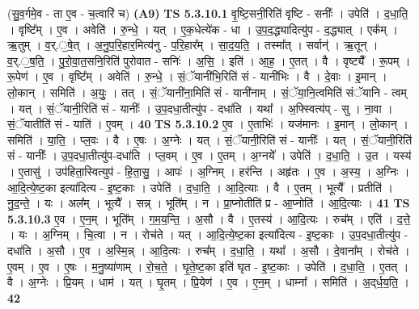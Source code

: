 \documentclass[17pt]{extarticle}
\begin{document}
                  \newline
                      (सु॒व॒र्गमे॒व - ता ए॒व - च॒त्वारि॑ च)  \textbf{(A9)} \newline \newline
                                \textbf{ TS 5.3.10.1} \newline
                  वृ॒ष्टि॒सनी॒रिति॑ वृष्टि - सनीः᳚ । उपेति॑ । द॒धा॒ति॒ । वृष्टि᳚म् । ए॒व । अवेति॑ । रु॒न्धे॒ । यत् । ए॒क॒धेत्ये॑क - धा । उ॒प॒द॒द्ध्यादित्यु॑प - द॒द्ध्यात् । एक᳚म् । ऋ॒तुम् । व॒र्.॒षे॒त् । अ॒नु॒प॒रि॒हार॒मित्य॑नु - प॒रि॒हार᳚म् । सा॒द॒य॒ति॒ । तस्मा᳚त् । सर्वान्॑ । ऋ॒तून् । व॒र्.॒ष॒ति॒ । पु॒रो॒वा॒त॒सनि॒रिति॑ पुरोवात - सनिः॑ । अ॒सि॒ । इति॑ । आ॒ह॒ । ए॒तत् । वै । वृष्ट्यै᳚ । रू॒पम् । रू॒पेण॑ । ए॒व । वृष्टि᳚म् । अवेति॑ । रु॒न्धे॒ । सं॒ॅयानी॑भि॒रिति॑ सं - यानी॑भिः । वै । दे॒वाः । इ॒मान् । लो॒कान् । समिति॑ । अ॒युः॒ । तत् । सं॒ॅयानी॑ना॒मिति॑ सं - यानी॑नाम् । सं॒ॅया॒नि॒त्वमिति॑ संॅयानि - त्वम् । यत् । सं॒ॅयानी॒रिति॑ सं - यानीः᳚ । उ॒प॒दधा॒तीत्यु॑प - दधा॑ति । यथा᳚ । अ॒फ्स्वित्य॑प् - सु । ना॒वा । सं॒ॅयातीति॑ सं - याति॑ । ए॒वम् । \textbf{  40} \newline
                  \newline
                                \textbf{ TS 5.3.10.2} \newline
                  ए॒व । ए॒ताभिः॑ । यज॑मानः । इ॒मान् । लो॒कान् । समिति॑ । या॒ति॒ । प्ल॒वः । वै । ए॒षः । अ॒ग्नेः । यत् । सं॒ॅयानी॒रिति॑ सं - यानीः᳚ । यत् । सं॒ॅयानी॒रिति॑ सं - यानीः᳚ । उ॒प॒दधा॒तीत्यु॑प-दधा॑ति । प्ल॒वम् । ए॒व । ए॒तम् । अ॒ग्नये᳚ । उपेति॑ । द॒धा॒ति॒ । उ॒त । यस्य॑ । ए॒तासु॑ । उप॑हिता॒स्वित्युप॑ - हि॒ता॒सु॒ । आपः॑ । अ॒ग्निम् । हर॑न्ति । अहृ॑तः । ए॒व । अ॒स्य॒ । अ॒ग्निः । आ॒दि॒त्ये॒ष्ट॒का इत्या॑दित्य - इ॒ष्ट॒काः । उपेति॑ । द॒धा॒ति॒ । आ॒दि॒त्याः । वै । ए॒तम् । भूत्यै᳚ । प्रतीति॑ । नु॒द॒न्ते॒ । यः । अल᳚म् । भूत्यै᳚ । सन्न् । भूति᳚म् । न । प्रा॒प्नोतीति॑ प्र - आ॒प्नोति॑ । आ॒दि॒त्याः । \textbf{  41} \newline
                  \newline
                                \textbf{ TS 5.3.10.3} \newline
                  ए॒व । ए॒न॒म् । भूति᳚म् । ग॒म॒य॒न्ति॒ । अ॒सौ । वै । ए॒तस्य॑ । आ॒दि॒त्यः । रुच᳚म् । एति॑ । द॒त्ते॒ । यः । अ॒ग्निम् । चि॒त्वा । न । रोच॑ते । यत् । आ॒दि॒त्ये॒ष्ट॒का इत्या॑दित्य - इ॒ष्ट॒काः । उ॒प॒दधा॒तीत्यु॑प - दधा॑ति । अ॒सौ । ए॒व । अ॒स्मि॒न्न् । आ॒दि॒त्यः । रुच᳚म् । द॒धा॒ति॒ । यथा᳚ । अ॒सौ । दे॒वाना᳚म् । रोच॑ते । ए॒वम् । ए॒व । ए॒षः । म॒नु॒ष्या॑णाम् । रो॒च॒ते॒ । घृ॒ते॒ष्ट॒का इति॑ घृत - इ॒ष्ट॒काः । उपेति॑ । द॒धा॒ति॒ । ए॒तत् । वै । अ॒ग्नेः । प्रि॒यम् । धाम॑ । यत् । घृ॒तम् । प्रि॒येण॑ । ए॒व । ए॒न॒म् । धाम्ना᳚ । समिति॑ । अ॒द्‌र्ध॒य॒ति॒ । \textbf{  42} \newline
\end{document}
